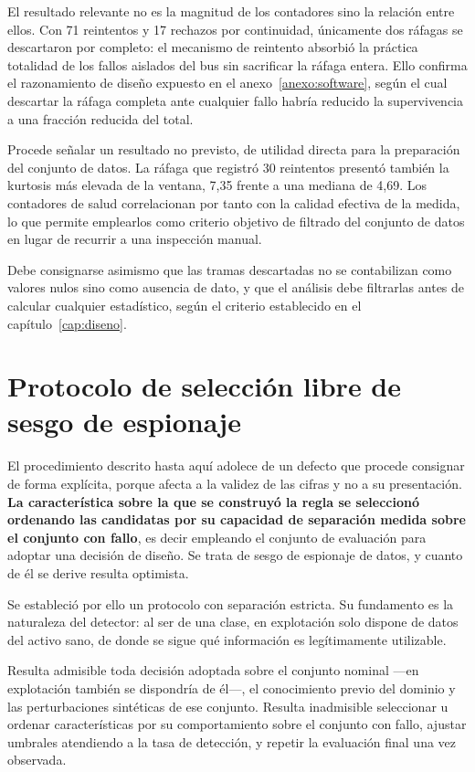 El resultado relevante no es la magnitud de los contadores sino la relación entre ellos. Con
71 reintentos y 17 rechazos por continuidad, únicamente dos ráfagas se descartaron por
completo: el mecanismo de reintento absorbió la práctica totalidad de los fallos aislados del
bus sin sacrificar la ráfaga entera. Ello confirma el razonamiento de diseño expuesto en el
anexo~\ref{anexo:software}, según el cual descartar la ráfaga completa ante cualquier fallo
habría reducido la supervivencia a una fracción reducida del total.

Procede señalar un resultado no previsto, de utilidad directa para la preparación del conjunto
de datos. La ráfaga que registró 30 reintentos presentó también la kurtosis más elevada de la
ventana, 7,35 frente a una mediana de 4,69. Los contadores de salud correlacionan por tanto
con la calidad efectiva de la medida, lo que permite emplearlos como criterio objetivo de
filtrado del conjunto de datos en lugar de recurrir a una inspección manual.

Debe consignarse asimismo que las tramas descartadas no se contabilizan como valores nulos
sino como ausencia de dato, y que el análisis debe filtrarlas antes de calcular cualquier
estadístico, según el criterio establecido en el capítulo~\ref{cap:diseno}.
\section{Protocolo de selección libre de sesgo de espionaje}

El procedimiento descrito hasta aquí adolece de un defecto que procede consignar de forma
explícita, porque afecta a la validez de las cifras y no a su presentación. \textbf{La
característica sobre la que se construyó la regla se seleccionó ordenando las candidatas por su
capacidad de separación medida sobre el conjunto con fallo}, es decir empleando el conjunto de
evaluación para adoptar una decisión de diseño. Se trata de sesgo de espionaje de datos, y
cuanto de él se derive resulta optimista.

Se estableció por ello un protocolo con separación estricta. Su fundamento es la naturaleza del
detector: al ser de una clase, en explotación solo dispone de datos del activo sano, de donde se
sigue qué información es legítimamente utilizable.

Resulta admisible toda decisión adoptada sobre el conjunto nominal —en explotación también se
dispondría de él—, el conocimiento previo del dominio y las perturbaciones sintéticas de ese
conjunto. Resulta inadmisible seleccionar u ordenar características por su comportamiento sobre
el conjunto con fallo, ajustar umbrales atendiendo a la tasa de detección, y repetir la
evaluación final una vez observada.

